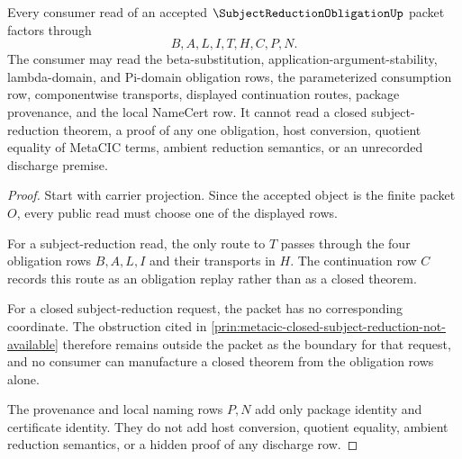\begin{theorem}
\label{thm:subject-reduction-obligation-nonescape}
Every consumer read of an accepted $\SubjectReductionObligationUp$ packet factors through
$$
B,A,L,I,T,H,C,P,N.
$$
The consumer may read the beta-substitution, application-argument-stability, lambda-domain, and Pi-domain obligation rows, the parameterized consumption row, componentwise transports, displayed continuation routes, package provenance, and the local NameCert row. It cannot read a closed subject-reduction theorem, a proof of any one obligation, host conversion, quotient equality of MetaCIC terms, ambient reduction semantics, or an unrecorded discharge premise.
\end{theorem}
\begin{proof}
Start with carrier projection. Since the accepted object is the finite packet $O$, every public read must choose one of the displayed rows.

For a subject-reduction read, the only route to $T$ passes through the four obligation rows $B,A,L,I$ and their transports in $H$. The continuation row $C$ records this route as an obligation replay rather than as a closed theorem.

For a closed subject-reduction request, the packet has no corresponding coordinate. The obstruction cited in \autoref{prin:metacic-closed-subject-reduction-not-available} therefore remains outside the packet as the boundary for that request, and no consumer can manufacture a closed theorem from the obligation rows alone.

The provenance and local naming rows $P,N$ add only package identity and certificate identity. They do not add host conversion, quotient equality, ambient reduction semantics, or a hidden proof of any discharge row.
\end{proof}

